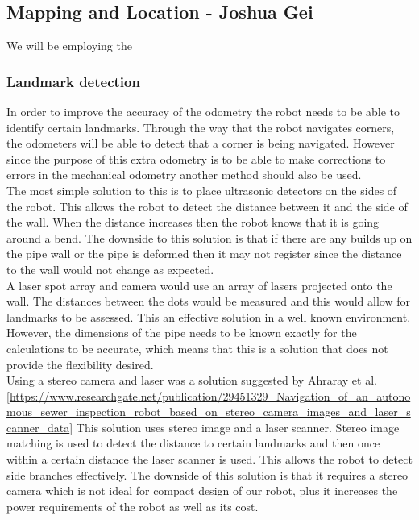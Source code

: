 \documentclass[11pt]{article}		%
\begin{document}
		\subsection[Mapping and Location]{Mapping and Location - Joshua Gei}

       		We will be employing the

		\subsubsection{Landmark detection}
	        In order to improve the accuracy of the odometry the robot needs to be able to identify certain landmarks. 
	        Through the way that the robot navigates corners, the odometers will be able to detect that a corner is being navigated.
	        However since the purpose of this extra odometry is to be able to make corrections to errors in the mechanical odometry another method should also be used.
	        \\
	        The most simple solution to this is to place ultrasonic detectors on the sides of the robot. 
	        This allows the robot to detect the distance between it and the side of the wall. 
	        When the distance increases then the robot knows that it is going around a bend. 
	        The downside to this solution is that if there are any builds up on the pipe wall or the pipe is deformed then it may not register since the distance to the wall would not change as expected.
	        \\
	        A laser spot array and camera would use an array of lasers projected onto the wall. 
	        The distances between the dots would be measured and this would allow for landmarks to be assessed. 
	        This an effective solution in a well known environment. 
	        However, the dimensions of the pipe needs to be known exactly for the calculations to be accurate, which means that this is a solution that does not provide the flexibility desired.
	        \\
	        Using a stereo camera and laser was a solution suggested by Ahraray et al. [\url{https://www.researchgate.net/publication/29451329_Navigation_of_an_autonomous_sewer_inspection_robot_based_on_stereo_camera_images_and_laser_scanner_data}] 
	        This solution uses stereo image and a laser scanner. 
	        Stereo image matching is used to detect the distance to certain landmarks and then once within a certain distance the laser scanner is used. 
	        This allows the robot to detect side branches effectively. 
	        The downside of this solution is that it requires a stereo camera which is not ideal for compact design of our robot, plus it increases the power requirements of the robot as well as its cost.
\end{document}
